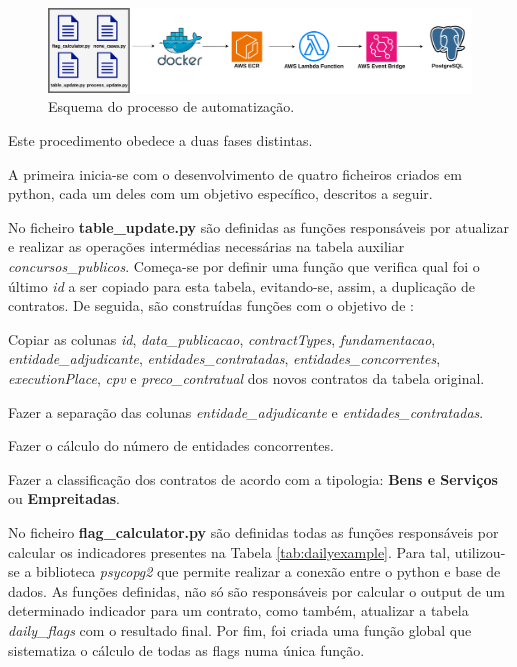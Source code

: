 \begin{figure}[H]
	\centering
	\includegraphics[width=\textwidth]{imagens/daily_flags_v2.png}
	\caption{Esquema do processo de automatização.}
	\label{fig:esquema}
\end{figure}


Este procedimento obedece a duas fases distintas. 

A primeira inicia-se com o desenvolvimento de quatro ficheiros criados em python, cada um deles com um objetivo específico, descritos a seguir. 

No ficheiro \textbf{table\_update.py} são definidas as funções responsáveis por atualizar e realizar as operações intermédias necessárias na tabela auxiliar \textit{concursos\_publicos}. Começa-se por definir uma função que verifica qual foi o último \textit{id} a ser copiado para esta tabela, evitando-se, assim, a duplicação de contratos. De seguida, são construídas funções com o objetivo de :

\begin{my_enumerate}
	
	\item Copiar as colunas \textit{id}, \textit{data\_publicacao}, 	\textit{contractTypes}, \textit{fundamentacao}, \textit{entidade\_adjudicante}, \textit{entidades\_contratadas}, \textit{entidades\_concorrentes}, \textit{executionPlace}, \textit{cpv} e \textit{preco\_contratual} dos novos contratos da tabela original.
	
	\item Fazer a separação das colunas \textit{entidade\_adjudicante} e \textit{entidades\_contratadas}.
	
	\item Fazer o cálculo do número de entidades concorrentes.
	
	\item Fazer a classificação dos contratos de acordo com a tipologia: \textbf{Bens e Serviços} ou \textbf{Empreitadas}.
	
\end{my_enumerate}



No ficheiro \textbf{flag\_calculator.py} são definidas todas as funções responsáveis por calcular os indicadores presentes na Tabela \ref{tab:dailyexample}. Para tal, utilizou-se a biblioteca \textit{psycopg2} que permite realizar a conexão entre o python e base de dados. As funções definidas, não só são responsáveis por calcular o output de um determinado indicador para um contrato, como também, atualizar a tabela \textit{daily\_flags} com o resultado final. Por fim, foi criada uma função global que sistematiza o cálculo de todas as flags numa única função.

